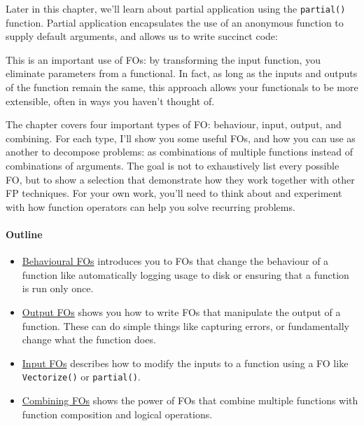 \begin{Shaded}
\begin{Highlighting}[]
\end{Highlighting}
\end{Shaded}

Later in this chapter, we'll learn about partial application using the
\texttt{partial()} function. Partial application encapsulates the use of
an anonymous function to supply default arguments, and allows us to
write succinct code:

\begin{Shaded}
\begin{Highlighting}[]
\NormalTok{(} 
\end{Highlighting}
\end{Shaded}

This is an important use of FOs: by transforming the input function, you
eliminate parameters from a functional. In fact, as long as the inputs
and outputs of the function remain the same, this approach allows your
functionals to be more extensible, often in ways you haven't thought of.

The chapter covers four important types of FO: behaviour, input, output,
and combining. For each type, I'll show you some useful FOs, and how you
can use as another to decompose problems: as combinations of multiple
functions instead of combinations of arguments. The goal is not to
exhaustively list every possible FO, but to show a selection that
demonstrate how they work together with other FP techniques. For your
own work, you'll need to think about and experiment with how function
operators can help you solve recurring problems.

\paragraph{Outline}

\begin{itemize}
\item
  \hyperref[behavioural-fos]{Behavioural FOs} introduces you to FOs that
  change the behaviour of a function like automatically logging usage to
  disk or ensuring that a function is run only once.
\item
  \hyperref[output-fos]{Output FOs} shows you how to write FOs that
  manipulate the output of a function. These can do simple things like
  capturing errors, or fundamentally change what the function does.
\item
  \hyperref[input-fos]{Input FOs} describes how to modify the inputs to
  a function using a FO like \texttt{Vectorize()} or \texttt{partial()}.
\item
  \hyperref[combining-fos]{Combining FOs} shows the power of FOs that
  combine multiple functions with function composition and logical
  operations.
\end{itemize}

